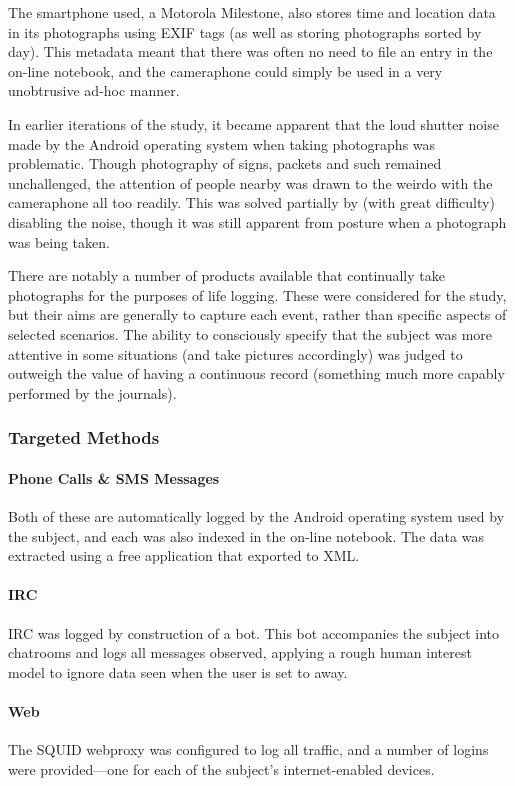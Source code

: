The smartphone used, a Motorola Milestone, also stores time and location data in its photographs using EXIF tags (as well as storing photographs sorted by day).  This metadata meant that there was often no need to file an entry in the on-line notebook, and the cameraphone could simply be used in a very unobtrusive ad-hoc manner.

In earlier iterations of the study, it became apparent that the loud shutter noise made by the Android operating system when taking photographs was problematic.  Though photography of signs, packets and such remained unchallenged, the attention of people nearby was drawn to the weirdo with the cameraphone all too readily.  This was solved partially by (with great difficulty) disabling the noise, though it was still apparent from posture when a photograph was being taken.

There are notably a number of products available that continually take photographs for the purposes of life logging.  These were considered for the study, but their aims are generally to capture each event, rather than specific aspects of selected scenarios.  The ability to consciously specify that the subject was more attentive in some situations (and take pictures accordingly) was judged to outweigh the value of having a continuous record (something much more capably performed by the journals).




\subsubsection{Targeted Methods}
\paragraph{Phone Calls \& SMS Messages}
Both of these are automatically logged by the Android operating system used by the subject, and each was also indexed in the on-line notebook.  The data was extracted using a free application that exported to XML.


\paragraph{IRC}
IRC was logged by construction of a bot.  This bot accompanies the subject into chatrooms and logs all messages observed, applying a rough human interest model to ignore data seen when the user is set to away.


\paragraph{Web}
The SQUID webproxy was configured to log all traffic, and a number of logins were provided---one for each of the subject's internet-enabled devices.

